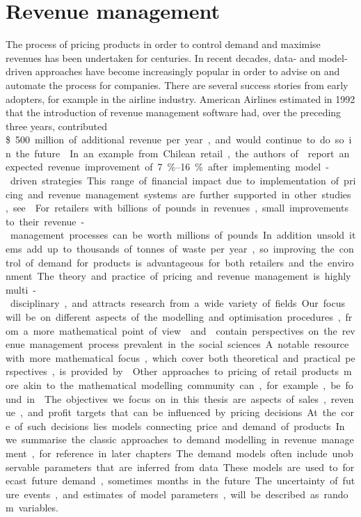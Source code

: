 \documentclass[main.tex]{subfiles}
\begin{document}
\section{Revenue management}

The process of pricing products in order to control demand and
maximise revenues has been undertaken for centuries. In recent
decades, data- and model-driven approaches have become increasingly
popular in order to advise on and automate the process for companies.
There are several success stories from early adopters, for example in
the airline industry.
American Airlines estimated in 1992 that the introduction of revenue
management software had, over the preceding three
years, contributed \SI{500}[\$] million of additional revenue per year,
and would continue to do so in the future~\cite{smith1992yield}.
In an example from Chilean retail, the authors of~\cite{bitran1998coordinating}
report an expected revenue improvement of \SIrange{7}{16}{\percent} after implementing
model-driven strategies.
This range of financial impact due to implementation of pricing and revenue
management systems are further supported in other studies, see \cite[Ch.~1.2]{phillips2005pricing}.
For retailers with billions of pounds in revenues, small
improvements to their revenue-management processes can be worth millions
of pounds.
In addition unsold items add up to thousands of tonnes of waste per year, so
improving the control of demand for products is advantageous
for both retailers and the environment.

The theory and practice of pricing and revenue management is highly
multi-disciplinary, and attracts research from a wide variety of
fields. Our focus will be on different aspects of the modelling and
optimisation procedures, from a more mathematical point of view.
\citet{phillips2005pricing} and \citet{ozer2012oxford} contain perspectives on the
revenue management process prevalent in the social sciences.
A notable resource with more mathematical focus, which
cover both theoretical and practical
perspectives, is provided by \citet{talluri2006theory}.
Other approaches to pricing of retail products more akin to the
mathematical modelling community can, for example, be found
in~\cite{butler2014customer}.

The objectives we focus on in this thesis are aspects of sales,
revenue, and profit targets that can be influenced by pricing
decisions.  At the core of such decisions lies models connecting price
and demand of products.  In  we summarise
the classic approaches to demand modelling in revenue management, for
reference in later chapters.  The demand models often include
unobservable parameters that are inferred from data.  These models are
used to forecast future demand, sometimes months in the future.  The
uncertainty of future events, and estimates of model parameters, will
be described as random variables.
\end{document}
